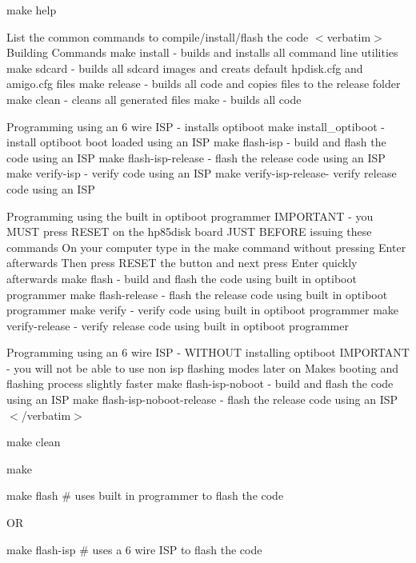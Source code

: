 \begin{DoxyItemize}
\item make help
\begin{DoxyItemize}
\item List the common commands to compile/install/flash the code $<$verbatim$>$ Building Commands make install -\/ builds and installs all command line utilities make sdcard -\/ builds all sdcard images and creats default hpdisk.\+cfg and amigo.\+cfg files make release -\/ builds all code and copies files to the release folder make clean -\/ cleans all generated files make -\/ builds all code

Programming using an 6 wire I\+SP -\/ installs optiboot make install\+\_\+optiboot -\/ install optiboot boot loaded using an I\+SP make flash-\/isp -\/ build and flash the code using an I\+SP make flash-\/isp-\/release -\/ flash the release code using an I\+SP make verify-\/isp -\/ verify code using an I\+SP make verify-\/isp-\/release-\/ verify release code using an I\+SP

Programming using the built in optiboot programmer I\+M\+P\+O\+R\+T\+A\+NT -\/ you M\+U\+ST press R\+E\+S\+ET on the hp85disk board J\+U\+ST B\+E\+F\+O\+RE issuing these commands On your computer type in the make command without pressing Enter afterwards Then press R\+E\+S\+ET the button and next press Enter quickly afterwards make flash -\/ build and flash the code using built in optiboot programmer make flash-\/release -\/ flash the release code using built in optiboot programmer make verify -\/ verify code using built in optiboot programmer make verify-\/release -\/ verify release code using built in optiboot programmer

Programming using an 6 wire I\+SP -\/ W\+I\+T\+H\+O\+UT installing optiboot I\+M\+P\+O\+R\+T\+A\+NT -\/ you will not be able to use non isp flashing modes later on Makes booting and flashing process slightly faster make flash-\/isp-\/noboot -\/ build and flash the code using an I\+SP make flash-\/isp-\/noboot-\/release -\/ flash the release code using an I\+SP $<$/verbatim$>$
\end{DoxyItemize}
\item make clean
\item make
\item make flash \# uses built in programmer to flash the code
\begin{DoxyItemize}
\item OR
\begin{DoxyItemize}
\item make flash-\/isp \# uses a 6 wire I\+SP to flash the code
\end{DoxyItemize}
\end{DoxyItemize}
\end{DoxyItemize}

